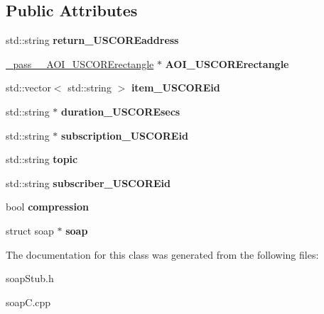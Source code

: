 \subsection*{Public Attributes}
\begin{DoxyCompactItemize}
\item 
\hypertarget{class__pass____subscribe_ae8863ffedb19920bd5c8e38bba3f1d25}{
std::string {\bfseries return\_\-USCOREaddress}}
\label{class__pass____subscribe_ae8863ffedb19920bd5c8e38bba3f1d25}

\item 
\hypertarget{class__pass____subscribe_a8032cc161060e68d6ad0b94f9dcae907}{
\hyperlink{class__pass____AOI__USCORErectangle}{\_\-pass\_\-\_\-AOI\_\-USCORErectangle} $\ast$ {\bfseries AOI\_\-USCORErectangle}}
\label{class__pass____subscribe_a8032cc161060e68d6ad0b94f9dcae907}

\item 
\hypertarget{class__pass____subscribe_ae688446f1e36c1962b53a9a8c43c4da2}{
std::vector$<$ std::string $>$ {\bfseries item\_\-USCOREid}}
\label{class__pass____subscribe_ae688446f1e36c1962b53a9a8c43c4da2}

\item 
\hypertarget{class__pass____subscribe_a842871672e9870607684d88fca6dfe3c}{
std::string $\ast$ {\bfseries duration\_\-USCOREsecs}}
\label{class__pass____subscribe_a842871672e9870607684d88fca6dfe3c}

\item 
\hypertarget{class__pass____subscribe_ad90ccb2fbfaff94e382b7428625afc86}{
std::string $\ast$ {\bfseries subscription\_\-USCOREid}}
\label{class__pass____subscribe_ad90ccb2fbfaff94e382b7428625afc86}

\item 
\hypertarget{class__pass____subscribe_ad0b348eda986db06baecbfc03422e221}{
std::string {\bfseries topic}}
\label{class__pass____subscribe_ad0b348eda986db06baecbfc03422e221}

\item 
\hypertarget{class__pass____subscribe_a9fb5e274f190e8ec4387140b77f4c095}{
std::string {\bfseries subscriber\_\-USCOREid}}
\label{class__pass____subscribe_a9fb5e274f190e8ec4387140b77f4c095}

\item 
\hypertarget{class__pass____subscribe_abd615acf322d623df1c5bcffabe99a85}{
bool {\bfseries compression}}
\label{class__pass____subscribe_abd615acf322d623df1c5bcffabe99a85}

\item 
\hypertarget{class__pass____subscribe_a7e71409a4efb57c869bba9e00a26e536}{
struct soap $\ast$ {\bfseries soap}}
\label{class__pass____subscribe_a7e71409a4efb57c869bba9e00a26e536}

\end{DoxyCompactItemize}


The documentation for this class was generated from the following files:\begin{DoxyCompactItemize}
\item 
soapStub.h\item 
soapC.cpp\end{DoxyCompactItemize}
